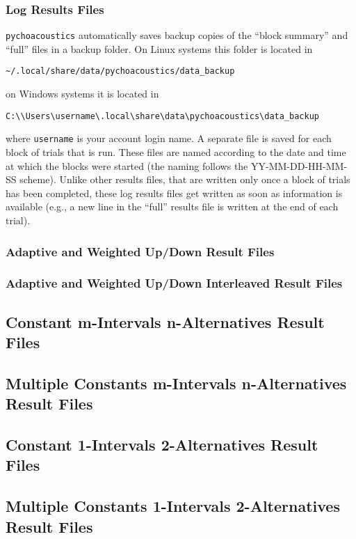 \subsubsection{Log Results Files}
\texttt{pychoacoustics} automatically saves backup copies of the ``block summary'' and ``full'' files in a backup folder. 
On Linux systems this folder is located in 
\begin{verbatim}
~/.local/share/data/pychoacoustics/data_backup
\end{verbatim}
on Windows systems it is located in
\begin{verbatim}
C:\\Users\username\.local\share\data\pychoacoustics\data_backup
\end{verbatim}
where \texttt{username} is your account login name.
A separate file is saved for each block of trials that is run. These files are named according to
the date and time at which the blocks were started (the naming follows the YY-MM-DD-HH-MM-SS scheme). 
Unlike other results files, that are written only once a block of trials has been completed,
these log results files get written as soon as information is available (e.g., a new line
in the ``full'' results file is written at the end of each trial).

\subsubsection{Adaptive and Weighted Up/Down Result Files}
\subsubsection{Adaptive and Weighted Up/Down Interleaved Result Files}
\subsection{Constant m-Intervals n-Alternatives Result Files}
\subsection{Multiple Constants m-Intervals n-Alternatives Result Files}
\subsection{Constant 1-Intervals 2-Alternatives Result Files}
\subsection{Multiple Constants 1-Intervals 2-Alternatives Result Files}
